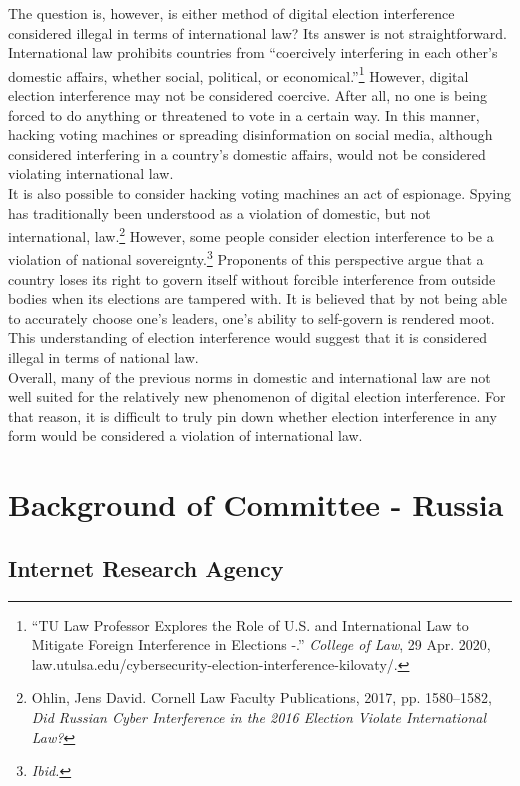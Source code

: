 \documentclass[10pt, letterpaper]{article}
\begin{document}
The question is, however, is either method of digital election
interference considered illegal in terms of international law? Its
answer is not straightforward. International law prohibits countries
from ``coercively interfering in each other's domestic affairs, whether
social, political, or economical.''\footnote{``TU Law Professor Explores
  the Role of U.S. and International Law to Mitigate Foreign
  Interference in Elections -.'' \emph{College of Law}, 29 Apr. 2020,
  law.utulsa.edu/cybersecurity-election-interference-kilovaty/.}
However, digital election interference may not be considered coercive.
After all, no one is being forced to do anything or threatened to vote
in a certain way. In this manner, hacking voting machines or spreading
disinformation on social media, although considered interfering in a
country's domestic affairs, would not be considered violating
international law. \\

It is also possible to consider hacking voting machines an act of
espionage. Spying has traditionally been understood as a violation of
domestic, but not international, law.\footnote{Ohlin, Jens David.
  Cornell Law Faculty Publications, 2017, pp. 1580--1582, \emph{Did
  Russian Cyber Interference in the 2016 Election Violate International
  Law?}} However, some people consider election interference to be a
violation of national sovereignty.\footnote{\emph{Ibid.}} Proponents of
this perspective argue that a country loses its right to govern itself
without forcible interference from outside bodies when its elections are
tampered with. It is believed that by not being able to accurately
choose one's leaders, one's ability to self-govern is rendered moot.
This understanding of election interference would suggest that it is
considered illegal in terms of national law. \\

Overall, many of the previous norms in domestic and international law
are not well suited for the relatively new phenomenon of digital
election interference. For that reason, it is difficult to truly pin
down whether election interference in any form would be considered a
violation of international law. \\

\newpage
\section{Background of Committee - Russia}
\subsection{Internet Research Agency}
\end{document}
